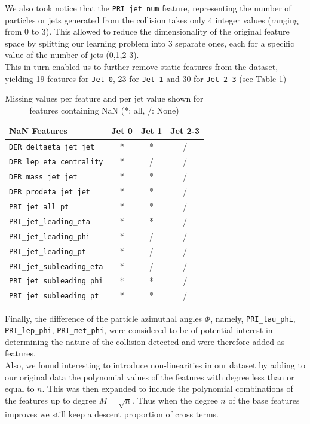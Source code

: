 \documentclass[10pt,conference,compsocconf]{IEEEtran}
\begin{document}
We also took notice that the \verb+PRI_jet_num+ feature, representing the number of particles or jets generated from the collision takes only 4 integer values (ranging from 0 to 3). This allowed to reduce the dimensionality of the original feature space by splitting our learning problem into 3 separate ones, each for a specific value of the number of jets (0,1,2-3).\\
This in turn enabled us to further remove static features from the dataset, yielding 19 features for  \verb+Jet 0+, 23 for \verb+Jet 1+ and 30 for \verb+Jet 2-3+ (see Table \ref{tab_feats})
\begin{table}[h!]
\centering
\caption{Missing values per feature and per jet value shown for features containing NaN (*: all, /: None)}
\footnotesize
\hspace{-0.2cm}
\begin{tabular}{ l| ccc } 
 \hline
   NaN Features & Jet 0 & Jet 1 & Jet 2-3 \\
 \hline
   \verb+DER_deltaeta_jet_jet+  & * & * & /  \\
   \verb+DER_lep_eta_centrality+  & * & / & / \\
   \verb+DER_mass_jet_jet+  & * & * & / \\
   \verb+DER_prodeta_jet_jet+  & * & * & /  \\ 
   \verb+PRI_jet_all_pt+  & * & * & /  \\
   \verb+PRI_jet_leading_eta+  & * & * & / \\
   \verb+PRI_jet_leading_phi+  & * & / & /   \\
   \verb+PRI_jet_leading_pt+  & * & / & / \\
   \verb+PRI_jet_subleading_eta+  & * & / & / \\
   \verb+PRI_jet_subleading_phi+  & * & * & /  \\
   \verb+PRI_jet_subleading_pt+  & * & * & /  \\
  \hline
\end{tabular}
\label{tab_feats}
\end{table}

Finally, the difference of the particle azimuthal angles $\Phi$, namely, \verb+PRI_tau_phi+, \verb+PRI_lep_phi+, \verb+PRI_met_phi+, were considered to be of potential interest  in determining the nature of the collision detected and were therefore added as features. \\
Also, we found interesting to introduce non-linearities in our dataset by adding to our original data the  polynomial values of the features with degree less than or equal to $n$. This was then expanded to include the polynomial combinations of the features up to degree $M=\sqrt{n}$. Thus when the degree $n$ of the base features improves we still keep a descent proportion of cross terms.\vspace{-0.25cm}
\end{document}
